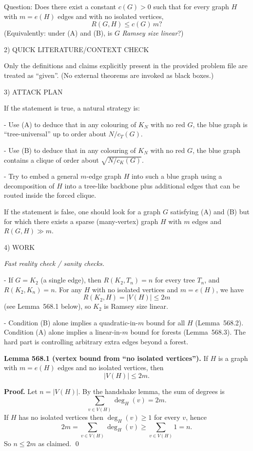 Question: Does there exist a constant $c(G)>0$ such that for every graph $H$ with $m=e(H)$ edges and with no isolated vertices,
\[
R(G,H) \le c(G)\,m?
\]
(Equivalently: under (A) and (B), is $G$ \emph{Ramsey size linear}?)

2) QUICK LITERATURE/CONTEXT CHECK

Only the definitions and claims explicitly present in the provided problem file are treated as ``given''. (No external theorems are invoked as black boxes.)

3) ATTACK PLAN

If the statement is true, a natural strategy is:

- Use (A) to deduce that in any colouring of $K_N$ with no red $G$, the blue graph is ``tree-universal'' up to order about $N/c_T(G)$.

- Use (B) to deduce that in any colouring of $K_N$ with no red $G$, the blue graph contains a clique of order about $\sqrt{N/c_K(G)}$.

- Try to embed a general $m$-edge graph $H$ into such a blue graph using a decomposition of $H$ into a tree-like backbone plus additional edges that can be routed inside the forced clique.

If the statement is false, one should look for a graph $G$ satisfying (A) and (B) but for which there exists a sparse (many-vertex) graph $H$ with $m$ edges and $R(G,H)\gg m$.

4) WORK

\emph{Fast reality check / sanity checks.}

- If $G=K_2$ (a single edge), then $R(K_2,T_n)=n$ for every tree $T_n$, and $R(K_2,K_n)=n$. For any $H$ with no isolated vertices and $m=e(H)$, we have
\[
R(K_2,H)=|V(H)|\le 2m
\]
(see Lemma~568.1 below), so $K_2$ is Ramsey size linear.

- Condition (B) alone implies a quadratic-in-$m$ bound for all $H$ (Lemma~568.2). Condition (A) alone implies a linear-in-$m$ bound for forests (Lemma~568.3). The hard part is controlling arbitrary extra edges beyond a forest.

\medskip

\textbf{Lemma 568.1 (vertex bound from ``no isolated vertices'').}
If $H$ is a graph with $m=e(H)$ edges and no isolated vertices, then
\[
|V(H)| \le 2m.
\]

\textbf{Proof.}
Let $n=|V(H)|$. By the handshake lemma, the sum of degrees is
\[
\sum_{v\in V(H)} \deg_H(v)=2m.
\]
If $H$ has no isolated vertices then $\deg_H(v)\ge 1$ for every $v$, hence
\[
2m=\sum_{v\in V(H)} \deg_H(v) \ge \sum_{v\in V(H)} 1 = n.
\]
So $n\le 2m$ as claimed. \qed

